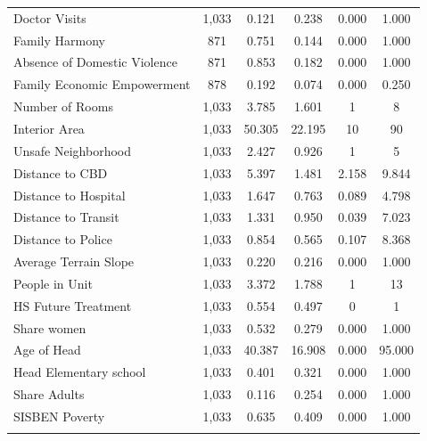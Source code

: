 \begin{table}[H]
\begin{tabular}{@{\extracolsep{-7pt}}lccccc}
Doctor Visits & 1,033 & 0.121 & 0.238 & 0.000 & 1.000 \\ 
Family Harmony & 871 & 0.751 & 0.144 & 0.000 & 1.000 \\ 
Absence of Domestic Violence & 871 & 0.853 & 0.182 & 0.000 & 1.000 \\ 
Family Economic Empowerment & 878 & 0.192 & 0.074 & 0.000 & 0.250 \\ 
Number of Rooms & 1,033 & 3.785 & 1.601 & 1 & 8 \\ 
Interior Area & 1,033 & 50.305 & 22.195 & 10 & 90 \\ 
Unsafe Neighborhood & 1,033 & 2.427 & 0.926 & 1 & 5 \\ 
Distance to CBD & 1,033 & 5.397 & 1.481 & 2.158 & 9.844 \\ 
Distance to Hospital & 1,033 & 1.647 & 0.763 & 0.089 & 4.798 \\ 
Distance to Transit & 1,033 & 1.331 & 0.950 & 0.039 & 7.023 \\ 
Distance to Police & 1,033 & 0.854 & 0.565 & 0.107 & 8.368 \\ 
Average Terrain Slope & 1,033 & 0.220 & 0.216 & 0.000 & 1.000 \\ 
People in Unit & 1,033 & 3.372 & 1.788 & 1 & 13 \\ 
HS Future Treatment & 1,033 & 0.554 & 0.497 & 0 & 1 \\ 
Share women & 1,033 & 0.532 & 0.279 & 0.000 & 1.000 \\ 
Age of Head & 1,033 & 40.387 & 16.908 & 0.000 & 95.000 \\ 
Head Elementary school & 1,033 & 0.401 & 0.321 & 0.000 & 1.000 \\ 
Share Adults & 1,033 & 0.116 & 0.254 & 0.000 & 1.000 \\ 
SISBEN Poverty & 1,033 & 0.635 & 0.409 & 0.000 & 1.000 \\ 
\hline \\[-1.8ex] 
\end{tabular} 
\end{table} 
